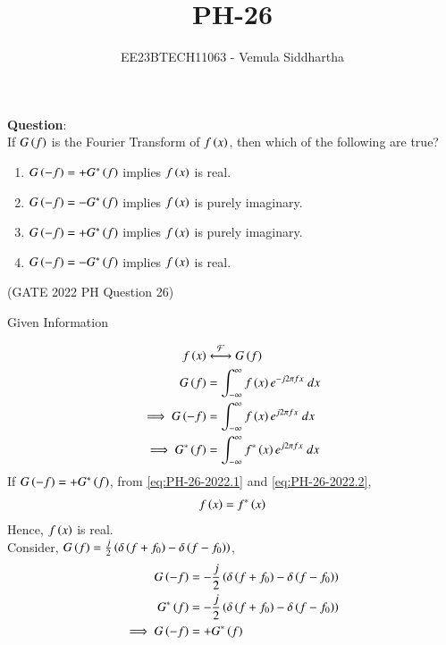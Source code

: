 \documentclass[journal,12pt,twocolumn]{IEEEtran}
\theoremstyle{remark}
\begin{document}

\vspace{3cm}

\title{PH-26}
\author{EE23BTECH11063 - Vemula Siddhartha}
\maketitle
\newpage
\bigskip

\renewcommand{\thefigure}{\theenumi}
\renewcommand{\thetable}{\theenumi}
\textbf{Question}:\\
If $G\left(f\right)$ is the Fourier Transform of $f\left(x\right)$, then which of the following are true?
\begin{enumerate}[label=(\alph*)]
    \item $G\left(-f\right)=+G^*\left(f\right)$ implies $f\left(x\right)$ is real.
    \item $G\left(-f\right)=-G^*\left(f\right)$ implies $f\left(x\right)$ is purely imaginary.
    \item $G\left(-f\right)=+G^*\left(f\right)$ implies $f\left(x\right)$ is purely imaginary.
    \item $G\left(-f\right)=-G^*\left(f\right)$ implies $f\left(x\right)$ is real.
\end{enumerate}
\hfill(GATE 2022 PH Question 26)\\
\solution
\begin{table}[h!]    
    \centering
    
    \caption{Given Information}
  \end{table}
\begin{align}
    f\brak{x} &\system{F} G\brak{f} \\
    G\brak{f} &= \int_{-\infty}^{\infty} f\brak{x} e^{-j 2 \pi f x}\;dx \\
    \implies G\brak{-f} &= \int_{-\infty}^{\infty} f\brak{x} e^{j 2 \pi f x}\; dx \label{eq:PH-26-2022.1} \\
    \implies G^*\brak{f} &= \int_{-\infty}^{\infty} f^*\brak{x} e^{j 2 \pi f x}\; dx \label{eq:PH-26-2022.2}
\end{align}
If $G\left(-f\right) = + G^*\left(f\right)$, from \eqref{eq:PH-26-2022.1} and \eqref{eq:PH-26-2022.2},
\begin{align}
    f\left(x\right) = f^*\left(x\right)
\end{align}
Hence, $f\left(x\right)$ is real. \\
Consider, $G\left(f\right) = \frac {j} {2} \left(\delta \left( f + f_0 \right) - \delta \left( f - f_0 \right)\right)$,
\begin{align}
    G\left(-f\right) &= -\frac{j}{2} \left(\delta\left( f + f_0 \right) - \delta\left( f - f_0\right) \right) \\
    G^*\left(f\right) &= -\frac{j}{2} \left(\delta\left( f + f_0 \right) - \delta\left( f - f_0 \right) \right) \\
    \implies G\left(-f\right) &= +G^*\left(f\right)
\end{align}
\end{document}
